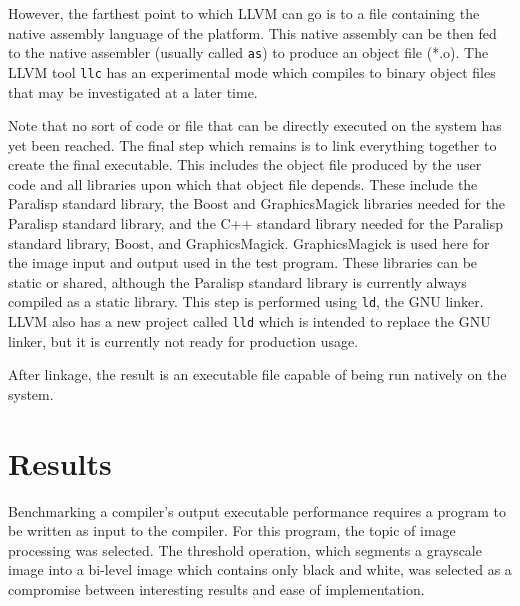 \documentclass[
abstracton,
fontsize=12pt,
]{scrartcl}
\begin{document}
However, the farthest point to which LLVM can go is to a file containing the native assembly language of the platform. This native assembly can be then fed to the native assembler (usually called \texttt{as}) to produce an object file (*.o). The LLVM tool \texttt{llc} has an experimental mode which compiles to binary object files that may be investigated at a later time.

Note that no sort of code or file that can be directly executed on the system has yet been reached. The final step which remains is to link everything together to create the final executable. This includes the object file produced by the user code and all libraries upon which that object file depends. These include the Paralisp standard library, the Boost and GraphicsMagick libraries needed for the Paralisp standard library, and the C++ standard library needed for the Paralisp standard library, Boost, and GraphicsMagick. GraphicsMagick is used here for the image input and output used in the test program. These libraries can be static or shared, although the Paralisp standard library is currently always compiled as a static library. This step is performed using \texttt{ld}, the GNU linker. LLVM also has a new project called \texttt{lld} which is intended to replace the GNU linker, but it is currently not ready for production usage.

After linkage, the result is an executable file capable of being run natively on the system.

\section{Results}

Benchmarking a compiler's output executable performance requires a program to be written as input to the compiler. For this program, the topic of image processing was selected. The threshold operation, which segments a grayscale image into a bi-level image which contains only black and white, was selected as a compromise between interesting results and ease of implementation.
\end{document}
